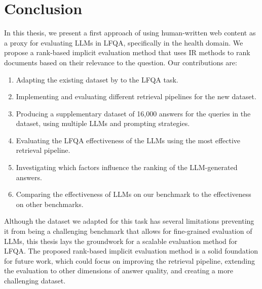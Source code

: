 \section{Conclusion}
In this thesis, we present a first approach of using human-written web content as a proxy for evaluating LLMs in LFQA, specifically in the health domain.
We propose a rank-based implicit evaluation method that uses IR methods to rank documents based on their relevance to the question.
Our contributions are:
\begin{enumerate}
    \item Adapting the existing dataset by \cite{goeuriot:2021:Consumer} to the LFQA task.
    \item Implementing and evaluating different retrieval pipelines for the new dataset.
    \item Producing a supplementary dataset of 16,000 answers for the queries in the dataset, using multiple LLMs and prompting strategies.
    \item Evaluating the LFQA effectiveness of the LLMs using the most effective retrieval pipeline.
    \item Investigating which factors influence the ranking of the LLM-generated answers.
    \item Comparing the effectiveness of LLMs on our benchmark to the effectiveness on other benchmarks.
\end{enumerate}

Although the dataset we adapted for this task has several limitations preventing it from being a challenging benchmark that allows for fine-grained evaluation of LLMs, this thesis lays the groundwork for a scalable evaluation method for LFQA.
The proposed rank-based implicit evaluation method is a solid foundation for future work, which could focus on improving the retrieval pipeline, extending the evaluation to other dimensions of answer quality, and creating a more challenging dataset.